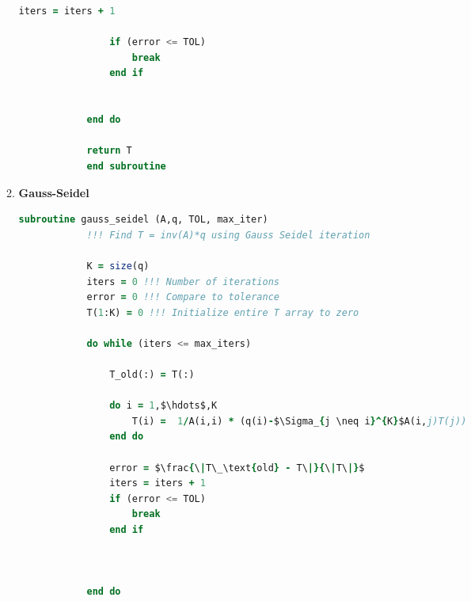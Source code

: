 \documentclass[12 pt, final]{article}
\begin{document}
\begin{itemize}
\begin{enumerate}
\begin{lstlisting}[language=fortran,mathescape=true]
                iters = iters + 1 
                
                if (error <= TOL)
                    break
                end if

                
            end do
            
            return T
            end subroutine
            \end{lstlisting}
                    
            \item \textbf{Gauss-Seidel}

            \begin{lstlisting}[language=fortran,mathescape=true]
            subroutine gauss_seidel (A,q, TOL, max_iter)
            !!! Find T = inv(A)*q using Gauss Seidel iteration
            
            K = size(q)
            iters = 0 !!! Number of iterations
            error = 0 !!! Compare to tolerance
            T(1:K) = 0 !!! Initialize entire T array to zero
            
            do while (iters <= max_iters)
            
                T_old(:) = T(:)
                
                do i = 1,$\hdots$,K
                    T(i) =  1/A(i,i) * (q(i)-$\Sigma_{j \neq i}^{K}$A(i,j)T(j))
                end do
                
                error = $\frac{\|T\_\text{old} - T\|}{\|T\|}$
                iters = iters + 1                
                if (error <= TOL)
                    break
                end if
                

                
            end do
            

\end{lstlisting}
\end{enumerate}
\end{itemize}
\end{document}
